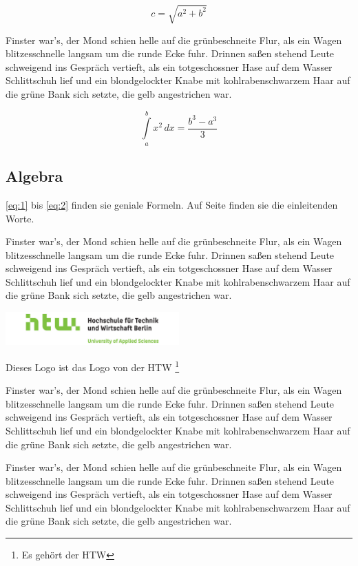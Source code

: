 \begin{equation}
    \label{eq:1}
    c = \sqrt{ a^{2} + b^{2} }
\end{equation}

Finster war's, der Mond schien helle auf die grünbeschneite Flur, als
ein Wagen blitzesschnelle langsam um die runde Ecke fuhr. Drinnen
saßen stehend Leute schweigend ins Gespräch vertieft, als ein
totgeschossner Hase auf dem Wasser Schlittschuh lief und ein
blondgelockter Knabe mit kohlrabenschwarzem Haar auf die grüne Bank
sich setzte, die gelb angestrichen war.

\begin{equation}
    \label{eq:2}
    \int\limits_{a}^{b} x^{2} \, dx = \frac{ b^{3} - a^{3} }{3}
\end{equation}

\subsection{Algebra}
\label{sec:algebra}

\eqref{eq:1} bis \eqref{eq:2} finden sie geniale Formeln.
Auf Seite \pageref{sec:caching-strategien} finden sie die einleitenden Worte.

Finster war's, der Mond schien helle auf die grünbeschneite Flur, als
ein Wagen blitzesschnelle langsam um die runde Ecke fuhr. Drinnen
saßen stehend Leute schweigend ins Gespräch vertieft, als ein
totgeschossner Hase auf dem Wasser Schlittschuh lief und ein
blondgelockter Knabe mit kohlrabenschwarzem Haar auf die grüne Bank
sich setzte, die gelb angestrichen war.

\begin{center}
    \includegraphics[width=0.5\textwidth]{img/HTW}
\end{center}
Dieses Logo ist das Logo von der HTW \footnote{Es gehört der HTW}

Finster war's, der Mond schien helle auf die grünbeschneite Flur, als
ein Wagen blitzesschnelle langsam um die runde Ecke fuhr. Drinnen
saßen stehend Leute schweigend ins Gespräch vertieft, als ein
totgeschossner Hase auf dem Wasser Schlittschuh lief und ein
blondgelockter Knabe mit kohlrabenschwarzem Haar auf die grüne Bank
sich setzte, die gelb angestrichen war.

Finster war's, der Mond schien helle auf die grünbeschneite Flur, als
ein Wagen blitzesschnelle langsam um die runde Ecke fuhr. Drinnen
saßen stehend Leute schweigend ins Gespräch vertieft, als ein
totgeschossner Hase auf dem Wasser Schlittschuh lief und ein
blondgelockter Knabe mit kohlrabenschwarzem Haar auf die grüne Bank
sich setzte, die gelb angestrichen war.

